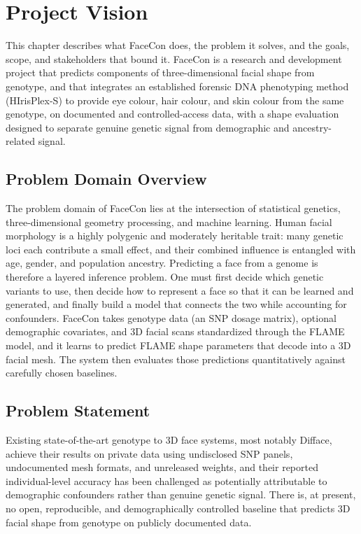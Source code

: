 \chapter{Project Vision}
\label{ch:vision}
This chapter describes what FaceCon does, the problem it solves, and the goals, scope, and stakeholders that bound it. FaceCon is a research and development project that predicts components of three-dimensional facial shape from genotype, and that integrates an established forensic DNA phenotyping method (HIrisPlex-S) to provide eye colour, hair colour, and skin colour from the same genotype, on documented and controlled-access data, with a shape evaluation designed to separate genuine genetic signal from demographic and ancestry-related signal.

\section{Problem Domain Overview}
The problem domain of FaceCon lies at the intersection of statistical genetics, three-dimensional geometry processing, and machine learning. Human facial morphology is a highly polygenic and moderately heritable trait: many genetic loci each contribute a small effect, and their combined influence is entangled with age, gender, and population ancestry. Predicting a face from a genome is therefore a layered inference problem. One must first decide which genetic variants to use, then decide how to represent a face so that it can be learned and generated, and finally build a model that connects the two while accounting for confounders. FaceCon takes genotype data (an SNP dosage matrix), optional demographic covariates, and 3D facial scans standardized through the FLAME model, and it learns to predict FLAME shape parameters that decode into a 3D facial mesh. The system then evaluates those predictions quantitatively against carefully chosen baselines.

\section{Problem Statement}
Existing state-of-the-art genotype to 3D face systems, most notably Difface, achieve their results on private data using undisclosed SNP panels, undocumented mesh formats, and unreleased weights, and their reported individual-level accuracy has been challenged as potentially attributable to demographic confounders rather than genuine genetic signal. There is, at present, no open, reproducible, and demographically controlled baseline that predicts 3D facial shape from genotype on publicly documented data.

